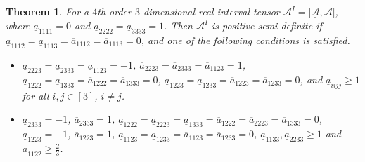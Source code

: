 \documentclass[twoside]{article}
\newtheorem{theorem}{Theorem}[section]
\begin{document}
\begin{theorem}\label{th3.3}
For a $4$th order $3$-dimensional real interval tensor ${\mathcal{A}}^I=[\underline{\mathcal{A}},\overline{\mathcal{A}]}$, where  $\underline{a}_{1111}=0$ and $\underline{a}_{2222}=\underline{a}_{3333}=1$. Then ${\mathcal{A}}^I$ is positive semi-definite if $\underline{a}_{1112}=\underline{a}_{1113}=\overline{a}_{1112}=\overline{a}_{1113}=0$, and one of the following conditions is satisfied.
\begin{itemize}
  \item [(a)] $\underline{a}_{2223}=\underline{a}_{2333}=\underline{a}_{1123}=-1$, $\overline{a}_{2223}=\overline{a}_{2333}=\overline{a}_{1123}=1$, $\underline{a}_{1222}=\underline{a}_{1333}=\overline{a}_{1222}=\overline{a}_{1333}=0$, $\underline{a}_{1223}=\underline{a}_{1233}=\overline{a}_{1223}=\overline{a}_{1233}=0$, and $\underline{a}_{iijj}\geq1$ for all $i,j\in[3]$, $i\neq j$.
  \item [(b)] $\underline{a}_{2333}=-1$, $\overline{a}_{2333}=1$, $\underline{a}_{1222}=\underline{a}_{2223}=\underline{a}_{1333}=\overline{a}_{1222}=\overline{a}_{2223}=\overline{a}_{1333}=0$, $\underline{a}_{1223}=-1$, $\overline{a}_{1223}=1$, $\underline{a}_{1123}=\underline{a}_{1233}=\overline{a}_{1123}=\overline{a}_{1233}=0$, $\underline{a}_{1133},\underline{a}_{2233}\geq1$ and $\underline{a}_{1122}\geq\frac{2}{3}$.
\end{itemize}
\end{theorem}
\end{document}
